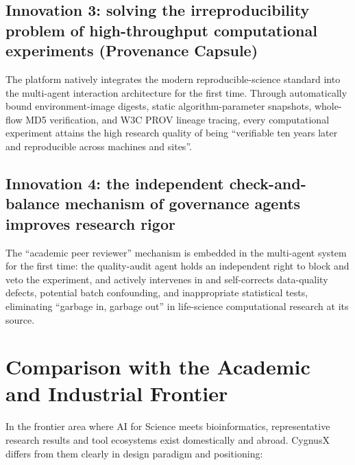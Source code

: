 \documentclass[11pt,a4paper]{article}
\begin{document}
\subsection{Innovation 3: solving the irreproducibility problem of high-throughput computational experiments (Provenance Capsule)}

The platform natively integrates the modern reproducible-science standard into the multi-agent interaction architecture for the first time. Through automatically bound environment-image digests, static algorithm-parameter snapshots, whole-flow MD5 verification, and W3C PROV lineage tracing, every computational experiment attains the high research quality of being ``verifiable ten years later and reproducible across machines and sites''.

\subsection{Innovation 4: the independent check-and-balance mechanism of governance agents improves research rigor}

The ``academic peer reviewer'' mechanism is embedded in the multi-agent system for the first time: the quality-audit agent holds an independent right to block and veto the experiment, and actively intervenes in and self-corrects data-quality defects, potential batch confounding, and inappropriate statistical tests, eliminating ``garbage in, garbage out'' in life-science computational research at its source.

\section{Comparison with the Academic and Industrial Frontier}

In the frontier area where AI for Science meets bioinformatics, representative research results and tool ecosystems exist domestically and abroad. CygnusX differs from them clearly in design paradigm and positioning:
\end{document}
